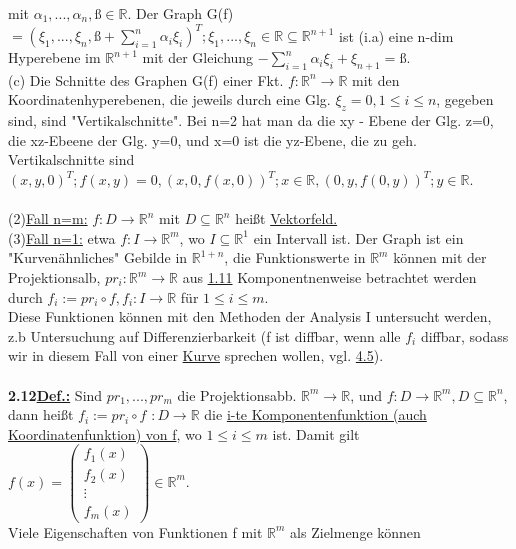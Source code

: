 \documentclass[]{scrartcl}
\begin{document}
mit $\alpha_1,...,\alpha_n, ß\in\mathbb{R}$. Der Graph 
G(f)$={(\xi_1,...,\xi_n,ß+\sum_{i=1}^{n}\alpha_i\xi_i)^T;\xi_1,...,\xi_n\in\mathbb{R}}\subseteq\mathbb{R}^{n+1}$
ist (i.a) eine n-dim Hyperebene im $\mathbb{R}^{n+1}$ mit der Gleichung 
$-\sum_{i=1}^{n}\alpha_i\xi_i+\xi_{n+1}=ß$.\\
(c) Die Schnitte des Graphen G(f) einer Fkt. $f:\mathbb{R}^n\rightarrow 
\mathbb{R}$ mit den Koordinatenhyperebenen, die jeweils durch eine Glg. 
$\xi_z=0,1\leq i\leq n$, gegeben sind, sind "Vertikalschnitte". Bei n=2 hat man 
da die xy - Ebene der Glg. z=0, die xz-Ebeene der Glg. y=0, und x=0 ist die 
yz-Ebene, die zu geh. Vertikalschnitte sind ${(x,y,0)^T; f(x,y)=0}, 
{(x,0,f(x,0))^T;x\in \mathbb{R}}, {(0,y,f(0,y))^T;y\in\mathbb{R}}.$\\
\\
(2)\underline{Fall n=m:} $f: D\rightarrow \mathbb{R}^n$ mit $ D \subseteq 
\mathbb{R}^n$ heißt \ul{Vektorfeld.}\\
(3)\underline{Fall n=1:} etwa $f:I\rightarrow\mathbb{R}^m$, wo $I \subseteq 
\mathbb{R}^1$ ein Intervall ist. Der Graph ist ein "Kurvenähnliches" Gebilde in 
$\mathbb{R}^{1+n}$, die Funktionswerte in $\mathbb{R}^m$ können mit der 
Projektionsalb, $pr_i:\mathbb{R}^m\rightarrow\mathbb{R}$ aus  
\ul{1.11} Komponentnenweise betrachtet werden durch $f_i:= pr_i\circ 
f,f_i:I\rightarrow\mathbb{R}$ für $1\leq i\leq m$.\\
Diese Funktionen können mit den Methoden der Analysis I untersucht werden, z.b 
Untersuchung auf Differenzierbarkeit (f ist diffbar, wenn alle $f_i$ diffbar, 
sodass wir in diesem Fall von einer \ul{Kurve} sprechen wollen, 
vgl. \ul{4.5}).\\
\\
\textbf{2.12\underline{Def.:}} Sind $pr_1,...,pr_m$ die Projektionsabb. 
$\mathbb{R}^m\rightarrow\mathbb{R}$, und $f: D\rightarrow\mathbb{R}^m, 
D\subseteq\mathbb{R}^n$, dann heißt \ul{$f_i:=pr_i\circ f$} 
$:D\rightarrow\mathbb{R}$ die \ul{i-te Komponentenfunktion (auch 
Koordinatenfunktion) von f}, wo $1\leq i \leq m$ ist. Damit gilt 
$f(x)=\begin{pmatrix}
	f_1(x)\\f_2(x)\\\vdots\\f_m(x)
\end{pmatrix}
\in \mathbb{R}^m$.\\
Viele Eigenschaften von Funktionen f mit $\mathbb{R}^m$ als Zielmenge können 
\end{document}
